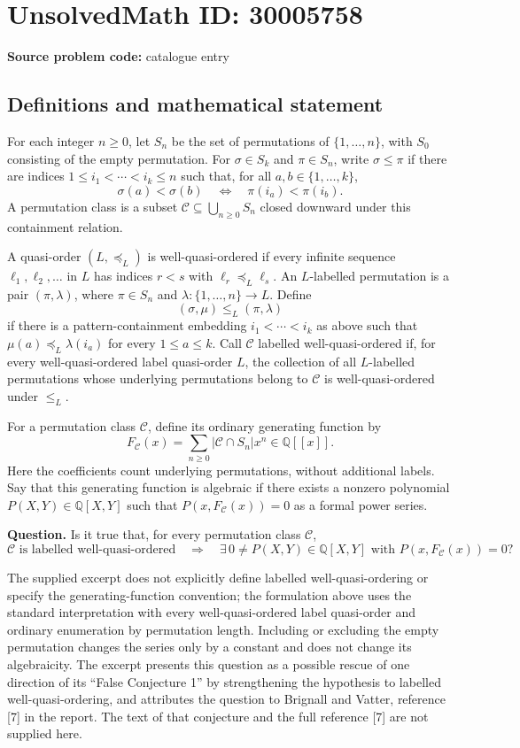 \documentclass[11pt]{article}
\newcommand{\Q}{\mathbb{Q}}
\begin{document}
\section*{UnsolvedMath ID: 30005758}
\textbf{Source problem code:} catalogue entry
\subsection{Definitions and mathematical statement}
For each integer \(n\geq 0\), let \(S_n\) be the set of permutations of \(\{1,\ldots,n\}\), with \(S_0\) consisting of the empty permutation. For \(\sigma\in S_k\) and \(\pi\in S_n\), write \(\sigma\leq\pi\) if there are indices \(1\leq i_1<\cdots<i_k\leq n\) such that, for all \(a,b\in\{1,\ldots,k\}\),
\[
\sigma(a)<\sigma(b)\quad\Longleftrightarrow\quad\pi(i_a)<\pi(i_b).
\]
A permutation class is a subset \(\mathcal C\subseteq\bigcup_{n\geq0}S_n\) closed downward under this containment relation.

A quasi-order \((L,\preceq_L)\) is well-quasi-ordered if every infinite sequence \(\ell_1,\ell_2,\ldots\) in \(L\) has indices \(r<s\) with \(\ell_r\preceq_L\ell_s\). An \(L\)-labelled permutation is a pair \((\pi,\lambda)\), where \(\pi\in S_n\) and \(\lambda:\{1,\ldots,n\}\to L\). Define
\[
(\sigma,\mu)\leq_L(\pi,\lambda)
\]
if there is a pattern-containment embedding \(i_1<\cdots<i_k\) as above such that \(\mu(a)\preceq_L\lambda(i_a)\) for every \(1\leq a\leq k\). Call \(\mathcal C\) labelled well-quasi-ordered if, for every well-quasi-ordered label quasi-order \(L\), the collection of all \(L\)-labelled permutations whose underlying permutations belong to \(\mathcal C\) is well-quasi-ordered under \(\leq_L\).

For a permutation class \(\mathcal C\), define its ordinary generating function by
\[
F_{\mathcal C}(x)=\sum_{n\geq0}|\mathcal C\cap S_n|x^n\in\Q[[x]].
\]
Here the coefficients count underlying permutations, without additional labels. Say that this generating function is algebraic if there exists a nonzero polynomial \(P(X,Y)\in\Q[X,Y]\) such that \(P(x,F_{\mathcal C}(x))=0\) as a formal power series.

\textbf{Question.} Is it true that, for every permutation class \(\mathcal C\),
\[
\mathcal C\text{ is labelled well-quasi-ordered}
\quad\Longrightarrow\quad
\exists\,0\neq P(X,Y)\in\Q[X,Y]\text{ with }P(x,F_{\mathcal C}(x))=0?
\]

The supplied excerpt does not explicitly define labelled well-quasi-ordering or specify the generating-function convention; the formulation above uses the standard interpretation with every well-quasi-ordered label quasi-order and ordinary enumeration by permutation length. Including or excluding the empty permutation changes the series only by a constant and does not change its algebraicity. The excerpt presents this question as a possible rescue of one direction of its ``False Conjecture 1'' by strengthening the hypothesis to labelled well-quasi-ordering, and attributes the question to Brignall and Vatter, reference [7] in the report. The text of that conjecture and the full reference [7] are not supplied here.
\end{document}

